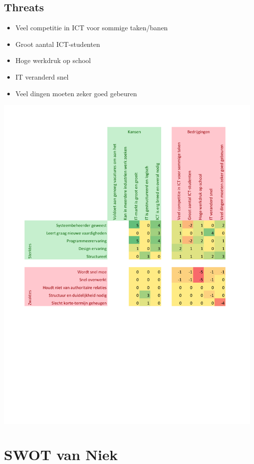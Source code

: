 \subsection{Threats}

\begin{itemize}
\item
  Veel competitie in ICT voor sommige taken/banen
\item
  Groot aantal ICT-studenten
\item
  Hoge werkdruk op school
\item
  IT veranderd snel
\item
  Veel dingen moeten zeker goed gebeuren
  
\end{itemize}

\includegraphics[width=\textwidth]{other/Swot-matrix-Jan}

\section{SWOT van Niek}

